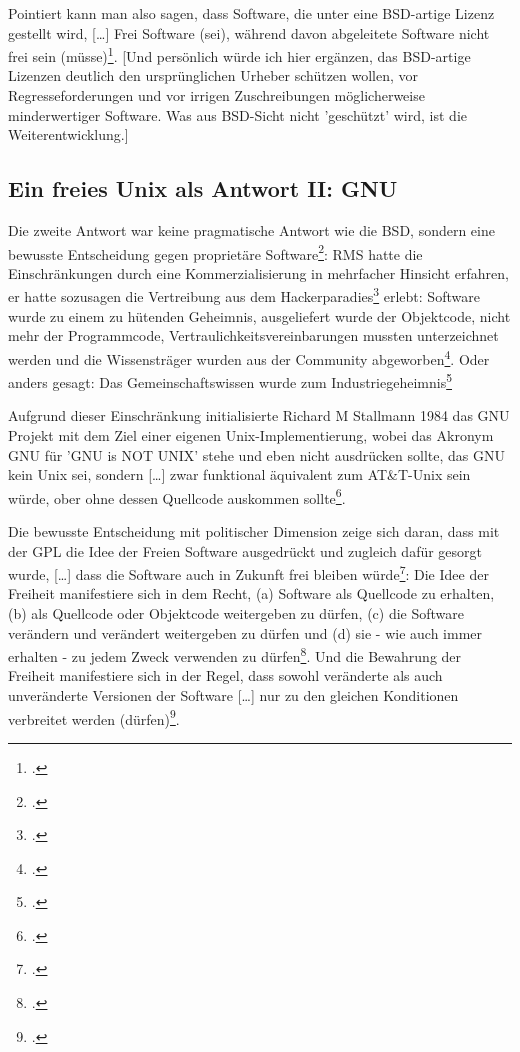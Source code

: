 \documentclass[DIV=calc,BCOR=5mm,11pt,headings=small,oneside,abstract=true, toc=bib]{scrartcl}
\begin{document}
Pointiert kann man also sagen, dass \glqq{}Software, die unter eine
BSD-artige Lizenz gestellt wird, [\ldots] Frei Software (sei), während
davon abgeleitete Software nicht frei sein
(müsse)\grqq{}\footcite[vgl.][108]{Eckl2004a}. [Und persönlich würde ich hier
ergänzen, das BSD-artige Lizenzen deutlich den ursprünglichen Urheber schützen
wollen, vor Regresseforderungen und vor irrigen Zuschreibungen möglicherweise
minderwertiger Software. Was aus BSD-Sicht nicht 'geschützt' wird, ist die
Weiterentwicklung.]

\subsection{Ein freies Unix als Antwort II: GNU}

Die zweite Antwort war keine pragmatische Antwort wie die BSD, sondern eine
\glqq{}bewusste Entscheidung gegen proprietäre
Software\grqq{}\footcite[vgl.][108]{Eckl2004a}: RMS hatte die Einschränkungen
durch eine Kommerzialisierung in mehrfacher Hinsicht erfahren, er hatte
sozusagen die Vertreibung aus dem
\glqq{}Hackerparadies\grqq{}\footcite[vgl.][109 Anm 117 - nach
Grassmuck]{Eckl2004a} erlebt: Software wurde zu einem \glqq{}zu hütenden
Geheimnis\grqq{}, ausgeliefert wurde der Objektcode, nicht mehr der
Programmcode, \glqq{}Vertraulichkeitsvereinbarungen\grqq{} mussten unterzeichnet
werden und die Wissensträger wurden aus der Community
abgeworben\footcite[vgl.][109]{Eckl2004a}. Oder anders gesagt: \glqq{}Das
Gemeinschaftswissen wurde zum
Industriegeheimnis\grqq{}\footcite[][109]{Eckl2004a}

Aufgrund dieser Einschränkung initialisierte Richard M Stallmann 1984 das
\glqq{}GNU Projekt\grqq{} mit dem Ziel einer \glqq{}eigenen
Unix-Implementierung\grqq{}, wobei das Akronym GNU für 'GNU is NOT UNIX' stehe
und eben nicht ausdrücken sollte, das GNU kein Unix sei, sondern \glqq{}[\ldots]
zwar funktional äquivalent zum AT\&T-Unix sein würde, ober ohne dessen
Quellcode auskommen sollte\grqq{}\footcite[][109]{Eckl2004a}.

Die bewusste Entscheidung mit politischer Dimension zeige sich daran, dass mit
der GPL die \glqq{}Idee der Freien Software\grqq{} ausgedrückt und zugleich
dafür gesorgt wurde, \glqq{}[\ldots] dass die Software auch in Zukunft
frei bleiben würde\grqq{}\footcite[vgl.][110]{Eckl2004a}: Die Idee der Freiheit
manifestiere sich in dem Recht, (a) Software als Quellcode zu erhalten, (b) als
Quellcode oder Objektcode weitergeben zu dürfen, (c) die Software verändern und
verändert weitergeben zu dürfen und (d) sie - wie auch immer erhalten - zu jedem
Zweck verwenden zu dürfen\footcite[vgl.][110]{Eckl2004a}. Und die Bewahrung der
Freiheit manifestiere sich in der Regel, dass \glqq{}sowohl veränderte
als auch unveränderte Versionen der Software [\ldots] nur zu den gleichen
Konditionen verbreitet werden (dürfen)\grqq{}\footcite[vgl.][110]{Eckl2004a}.
\end{document}

